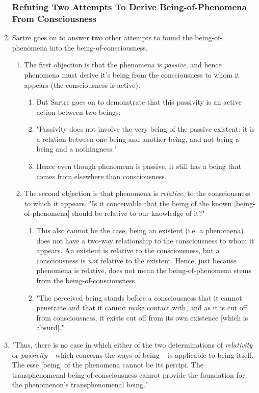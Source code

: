 \begin{enumerate}
  \subsubsection{Refuting Two Attempts To Derive Being-of-Phenomena From Consciousness}
  \item Sartre goes on to answer two other attempts to found the being-of-phenomena into the being-of-consciousness.
  \begin{enumerate}
    \item The first objection is that the phenomena is \emph{passive}, and hence phenomena must derive it's being from the consciousness to whom it appears (the consciousness is active).
    \begin{enumerate}
      \item But Sartre goes on to demonstrate that this passivity is an active action between two beings:
      \item "Passivity does not involve the very being of the passive existent: it is a relation between one being and another being, and not being a being and a nothingness." \autocite[18]{sartre}
      \item Hence even though phenomena is passive, it still has a being that comes from elsewhere than consciousness.
    \end{enumerate}
    \item The second objection is that phenomena is \emph{relative}, to the consciousness to which it appears. "Is it conceivable that the being of the known [being-of-phenomena] should be relative to our knowledge of it?" \autocite[20]{sartre}
    \begin{enumerate}
      \item This also cannot be the case, being an existent (i.e. a phenomena) does not have a two-way relationship to the consciousness to whom it appears. An existent is relative to the consciousness, but a consciousness is \emph{not} relative to the existent. Hence, just because phenomena is relative, does not mean the being-of-phenomena stems from the being-of-consciousness.
      \item "The perceived being stands before a consciousness that it cannot penetrate and that it cannot make contact with, and as it is cut off from consciousness, it exists cut off from its own existence [which is absurd]." \autocite[20]{sartre}
    \end{enumerate}
  \end{enumerate}
  \item "Thus, there is no case in which either of the two determinations of \emph{relativity} or \emph{passivity} -- which concerns the ways of being -- is applicable to being itself. The esse [being] of the phenomena cannot be its percipi. The transphenomenal being-of-consciousness cannot provide the foundation for the phenomenon's transphenomenal being." \autocite[20]{sartre}
\end{enumerate}

